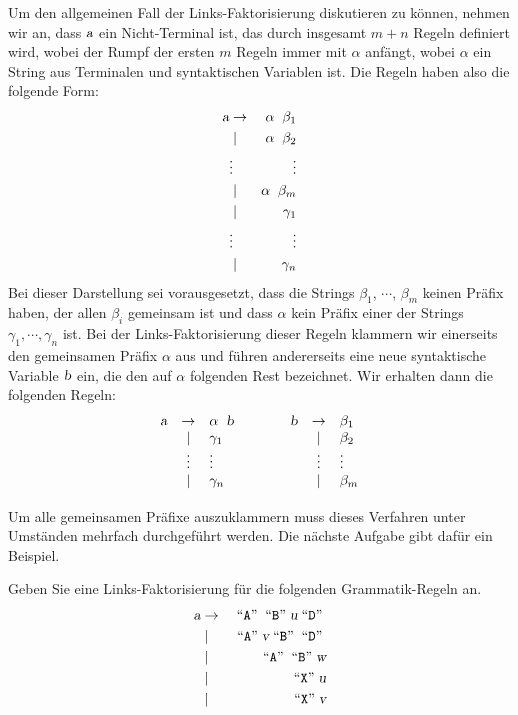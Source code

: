Um den allgemeinen Fall der Links-Faktorisierung diskutieren zu k\"onnen, nehmen wir an, dass
$\textsl{a}$ ein Nicht-Terminal ist, das durch insgesamt $m + n$ Regeln definiert wird, wobei der
Rumpf der ersten $m$ Regeln immer mit $\alpha$ anf\"angt, wobei $\alpha$ ein String aus
Terminalen und syntaktischen Variablen ist.  Die Regeln haben also die folgende Form:
\begin{eqnarray*}
  \textsl{a} & \rightarrow & \alpha \;\; \beta_1 \\
    & \mid        & \alpha \;\; \beta_2 \\
    & \vdots      & \vdots              \\
    & \mid        & \alpha \;\; \beta_m \\
    & \mid        & \gamma_1            \\
    & \vdots      & \vdots              \\
    & \mid        & \gamma_n            
\end{eqnarray*}
Bei dieser Darstellung sei vorausgesetzt, dass die Strings $\beta_1$, $\cdots$, $\beta_m$
keinen  Pr\"afix haben, der allen $\beta_i$ gemeinsam ist und dass $\alpha$ kein Pr\"afix einer der Strings
$\gamma_1, \cdots, \gamma_n$ ist.  Bei der Links-Faktorisierung dieser Regeln klammern wir einerseits den
gemeinsamen Pr\"afix $\alpha$ aus und f\"uhren andererseits eine neue syntaktische Variable $\textsl{b}$ ein, die
den auf $\alpha$ folgenden Rest bezeichnet.  Wir erhalten dann die folgenden Regeln:
\[
\begin{array}{lclclcl}
  \textsl{a} & \rightarrow & \alpha \;\; \textsl{b} & \qquad & \textsl{b} & \rightarrow & \beta_1   \\
    & \mid        & \gamma_1      &        &   & \mid        & \beta_2   \\
    & \vdots      & \vdots        &        &   & \vdots      & \vdots    \\
    & \mid        & \gamma_n      &        &   & \mid        & \beta_m   \\[0.2cm]
\end{array}
\]
Um alle gemeinsamen Pr\"afixe auszuklammern muss dieses Verfahren unter 
Umst\"anden mehrfach durchgef\"uhrt werden.  Die n\"achste Aufgabe gibt daf\"ur ein Beispiel.

\exercise
Geben Sie eine Links-Faktorisierung f\"ur die folgenden Grammatik-Regeln an.
\begin{eqnarray*}
  \textsl{a} & \rightarrow & \;\mbox{``\texttt{A}''}\; \;\mbox{``\texttt{B}''}\; \textsl{u} \;\mbox{``\texttt{D}''}\; \\
             & \mid        & \;\mbox{``\texttt{A}''}\; \textsl{v} \;\mbox{``\texttt{B}''}\; \;\mbox{``\texttt{D}''}\; \\
             & \mid        & \;\mbox{``\texttt{A}''}\; \;\mbox{``\texttt{B}''}\; \textsl{w}            \\
             & \mid        & \;\mbox{``\texttt{X}''}\; \textsl{u}                       \\
             & \mid        & \;\mbox{``\texttt{X}''}\; \textsl{v}                       
\end{eqnarray*}

